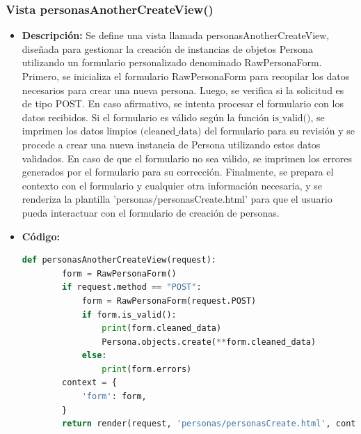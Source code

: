 \documentclass{article}
\begin{document}
  \subsubsection{Vista personasAnotherCreateView()}
  \begin{itemize}
    \item \textbf{Descripción: }Se define una vista llamada personasAnotherCreateView, diseñada para gestionar la creación de instancias de 
    objetos Persona utilizando un formulario personalizado denominado RawPersonaForm.
    \newline
    Primero, se inicializa el formulario RawPersonaForm para recopilar los datos necesarios para crear una nueva persona. Luego, 
    se verifica si la solicitud es de tipo POST. En caso afirmativo, se intenta procesar el formulario con los datos recibidos.
    \newline
    Si el formulario es válido según la función $\text{is\_valid()}$, se imprimen los datos limpios $\text{(cleaned\_data)}$ del formulario para su revisión 
    y se procede a crear una nueva instancia de Persona utilizando estos datos validados. En caso de que el formulario no sea válido, se 
    imprimen los errores generados por el formulario para su corrección.
    \newline
    Finalmente, se prepara el contexto con el formulario y cualquier otra información necesaria, y se renderiza la plantilla 
    'personas/personasCreate.html' para que el usuario pueda interactuar con el formulario de creación de personas.
    \item \textbf{Código: }
    \begin{lstlisting}[language=Python]
      def personasAnotherCreateView(request):
        form = RawPersonaForm()
        if request.method == "POST":
            form = RawPersonaForm(request.POST)
            if form.is_valid():
                print(form.cleaned_data)
                Persona.objects.create(**form.cleaned_data)
            else:
                print(form.errors)
        context = {
            'form': form,
        }
        return render(request, 'personas/personasCreate.html', context)
  \end{lstlisting}   
  \end{itemize}
  
  
\end{document}
